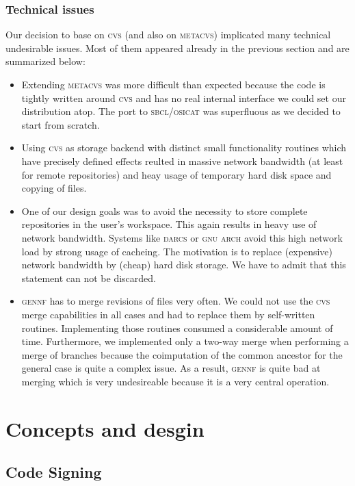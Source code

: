 \documentclass[fleqn, 10pt, a4paper]{report} \usepackage{amssymb}
\newcommand{\GENNF}{\textsc{gennf}}
\begin{document}
\subsection{Technical issues}

Our decision to base on \textsc{cvs} (and also on \textsc{metacvs})
implicated many technical
undesirable issues. Most of them appeared already in the previous
section and are summarized below:

\begin{itemize}
\item Extending \textsc{metacvs} was more difficult than expected
  because the code is tightly written around \textsc{cvs} and has no
  real internal interface we could set our distribution atop.  The
  port to \textsc{sbcl}/\textsc{osicat} was superfluous as we decided
  to start from scratch.
\item Using \textsc{cvs} as storage backend with distinct small
  functionality routines which have precisely defined effects reulted
  in massive network bandwidth (at least for remote repositories) and
  heay usage of temporary hard disk space and copying of files.
\item One of our design goals was to avoid the necessity to store
  complete repositories in the user's workspace. This again results in
  heavy use of network bandwidth. Systems like \textsc{darcs} or
  \textsc{gnu arch} avoid this high network load by strong usage of
  cacheing. The motivation is to replace (expensive) network bandwidth
  by (cheap) hard disk storage. We have to admit that this statement
  can not be discarded.
\item \GENNF{} has to merge revisions of files very often. We could
  not use the \textsc{cvs} merge capabilities in all cases and had to
  replace them by self-written routines. Implementing those routines
  consumed a considerable amount of time.  Furthermore, we implemented
  only a two-way merge when performing a merge of branches because the
  coimputation of the common ancestor for the general case is quite a
  complex issue.  As a result, \GENNF{} is quite bad at merging which
  is very undesireable because it is a very central operation.
\end{itemize}


\chapter{Concepts and desgin}

\section{Code Signing \label{codesigning}}
\end{document}
